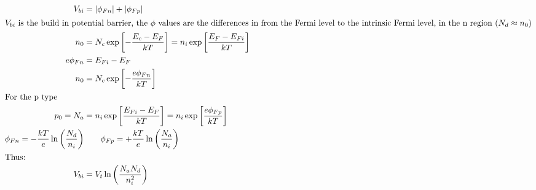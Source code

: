 \begin{columns}
{%

\begin{align*}
        V_{bi}&=\lvert\phi_{Fn}\rvert+\lvert\phi_{Fp}\rvert\\
        \intertext{$V_{bi}$ is the build in potential barrier, the $\phi$ values are the differences in from the Fermi level to the intrinsic Fermi level, in the n region ($N_d\approx n_0$)}
        n_0&=N_c\exp\left[ -\frac{E_{c}-E_{F}}{kT} \right]=n_{i}\exp\left[ \frac{E_{F}-E_{Fi}}{kT} \right]\\
        e\phi_{Fn} &=E_{Fi}-E_{F}\\
        n_0&=N_c\exp\left[ -\frac{e\phi_{Fn}}{kT} \right]\\
        \intertext{For the p type}
        p_0=N_a&=n_i\exp\left[ \frac{E_{Fi}-E_{F}}{kT} \right]=n_i\exp\left[ \frac{e\phi_{Fp}}{kT} \right]\\
        \phi_{Fn}=-\frac{kT}{e}\ln\left( \frac{N_d}{n_i} \right)&\qquad \phi_{Fp}=+\frac{kT}{e}\ln\left( \frac{N_a}{n_i} \right)\\
        \intertext{Thus:}
        V_{bi}&=V_t\ln\left( \frac{N_aN_d}{n_i^2} \right)\\
\end{align*}


}
\end{columns}
